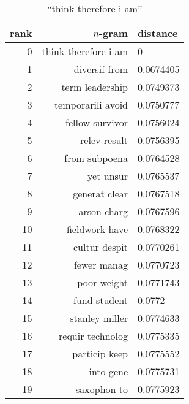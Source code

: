 \begin{table}[t]
    \begin{subtable}[t]{.45\textwidth}
        \centering
        \begin{tabularx}{\textwidth}{r R l}
            \toprule
            rank & $n$-gram & distance\\
            \midrule
            \num{0} & think therefore i am & \num{0}\\
            \num{1} & diversif from & \num{0.0674405}\\
            \num{2} & term leadership & \num{0.0749373}\\
            \num{3} & temporarili avoid & \num{0.0750777}\\
            \num{4} & fellow survivor & \num{0.0756024}\\
            \midrule
            \num{5} & relev result & \num{0.0756395}\\
            \num{6} & from subpoena & \num{0.0764528}\\
            \num{7} & yet unsur & \num{0.0765537}\\
            \num{8} & generat clear & \num{0.0767518}\\
            \num{9} & arson charg & \num{0.0767596}\\
            \num{10} & fieldwork have & \num{0.0768322}\\
            \num{11} & cultur despit & \num{0.0770261}\\
            \num{12} & fewer manag & \num{0.0770723}\\
            \num{13} & poor weight & \num{0.0771743}\\
            \num{14} & fund student & \num{0.0772}\\
            \num{15} & stanley miller & \num{0.0774633}\\
            \num{16} & requir technolog & \num{0.0775335}\\
            \num{17} & particip keep & \num{0.0775552}\\
            \num{18} & into gene & \num{0.0775731}\\
            \num{19} & saxophon to & \num{0.0775923}\\
            \bottomrule
        \end{tabularx}
        \caption{\enquote{think therefore i am}}\label{tab:ranking_chance_1}
    \end{subtable}
    \hfill
    \begin{subtable}[t]{.45\textwidth}

\end{subtable}
\end{table}
